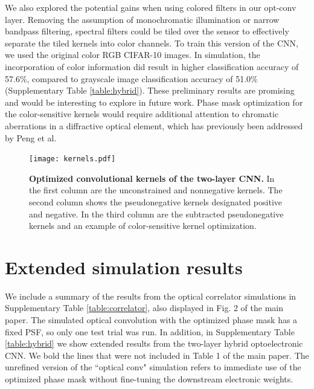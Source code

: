 \documentclass[fleqn,10pt]{wlscirepsupp}
\begin{document}
We also explored the potential gains when using colored filters in our opt-conv layer. Removing the assumption of monochromatic illumination or narrow bandpass filtering, spectral filters could be tiled over the sensor to effectively separate the tiled kernels into color channels. To train this version of the CNN, we used the original color RGB CIFAR-10 images. In simulation, the incorporation of color information did result in higher classification accuracy of 57.6\%, compared to grayscale image classification accuracy of 51.0\% (Supplementary Table \ref{table:hybrid}).  These preliminary results are promising and would be interesting to explore in future work. Phase mask optimization for the color-sensitive kernels would require additional attention to chromatic aberrations in a diffractive optical element, which has previously been addressed by Peng et al. \cite{peng2016diffractive}

\begin{figure}[htbp]
\centering
\texttt{[image: kernels.pdf]}
\caption{\textbf{Optimized convolutional kernels of the two-layer CNN.} In the first column are the unconstrained and nonnegative kernels. The second column shows the pseudonegative kernels designated positive and negative. In the third column are the subtracted pseudonegative kernels and an example of color-sensitive kernel optimization.}
\label{fig:kernels}
\end{figure}


\section{Extended simulation results}

We include a summary of the results from the optical correlator simulations in Supplementary Table \ref{table:correlator}, also displayed in Fig. 2 of the main paper. The simulated optical convolution with the optimized phase mask has a fixed PSF, so only one test trial was run. In addition, in Supplementary Table \ref{table:hybrid} we show extended results from the two-layer hybrid optoelectronic CNN. We bold the lines that were not included in Table 1 of the main paper. The unrefined version of the ``optical conv" simulation refers to immediate use of the optimized phase mask without fine-tuning the downstream electronic weights.
\end{document}
